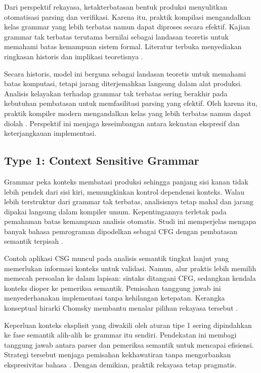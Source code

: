 \documentclass[../main.tex]{subfiles}
\begin{document}
Dari perspektif rekayasa, ketakterbatasan bentuk produksi menyulitkan otomatisasi parsing dan verifikasi. Karena itu, praktik kompilasi mengandalkan kelas grammar yang lebih terbatas namun dapat diproses secara efektif. Kajian grammar tak terbatas terutama bernilai sebagai landasan teoretis untuk memahami batas kemampuan sistem formal. Literatur terbuka menyediakan ringkasan historis dan implikasi teoretisnya \citep{WikiChomsky}.

Secara historis, model ini berguna sebagai landasan teoretis untuk memahami batas komputasi, tetapi jarang diterjemahkan langsung dalam alat produksi. Analisis kelayakan terhadap grammar tak terbatas sering berakhir pada kebutuhan pembatasan untuk memfasilitasi parsing yang efektif. Oleh karena itu, praktik kompiler modern mengandalkan kelas yang lebih terbatas namun dapat diolah \citep{WikiChomsky}. Perspektif ini menjaga keseimbangan antara kekuatan ekspresif dan keterjangkauan implementasi.

\subsection{Type 1: Context Sensitive Grammar}
Grammar peka konteks membatasi produksi sehingga panjang sisi kanan tidak lebih pendek dari sisi kiri, memungkinkan kontrol dependensi konteks. Walau lebih terstruktur dari grammar tak terbatas, analisisnya tetap mahal dan jarang dipakai langsung dalam kompiler umum. Kepentingannya terletak pada pemahaman batas kemampuan analisis otomatis. Studi ini memperjelas mengapa banyak bahasa pemrograman dipodelkan sebagai CFG dengan pembatasan semantik terpisah \citep{WikiChomsky}.

Contoh aplikasi CSG muncul pada analisis semantik tingkat lanjut yang memerlukan informasi konteks untuk validasi. Namun, alur praktis lebih memilih memecah persoalan ke dalam lapisan: sintaks ditangani CFG, sedangkan kendala konteks dioper ke pemeriksa semantik. Pemisahan tanggung jawab ini menyederhanakan implementasi tanpa kehilangan ketepatan. Kerangka konseptual hirarki Chomsky membantu menalar pilihan rekayasa tersebut \citep{WikiChomsky}.

Keperluan konteks eksplisit yang diwakili oleh aturan tipe 1 sering dipindahkan ke fase semantik alih-alih ke grammar itu sendiri. Pendekatan ini membagi tanggung jawab antara parser dan pemeriksa semantik untuk mencapai efisiensi. Strategi tersebut menjaga pemisahan kekhawatiran tanpa mengorbankan ekspresivitas bahasa \citep{WikiChomsky}. Dengan demikian, praktik rekayasa tetap pragmatis.
\end{document}
